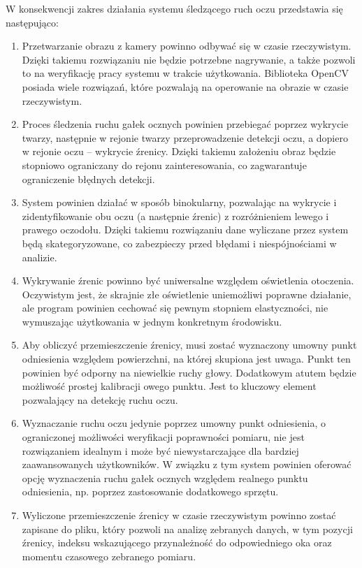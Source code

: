 \documentclass[a4paper,twoside,12pt]{book}
\begin{document}
W konsekwencji zakres działania systemu śledzącego ruch oczu przedstawia się następująco:

\begin{enumerate}
	\item Przetwarzanie obrazu z kamery powinno odbywać się w czasie rzeczywistym. Dzięki takiemu rozwiązaniu nie będzie potrzebne nagrywanie, a także pozwoli to na weryfikację pracy systemu w trakcie użytkowania. Biblioteka OpenCV posiada wiele rozwiązań, które pozwalają na operowanie na obrazie w czasie rzeczywistym.
	\item Proces śledzenia ruchu gałek ocznych powinien przebiegać poprzez wykrycie twarzy, następnie w rejonie twarzy przeprowadzenie detekcji oczu, a dopiero w rejonie oczu -- wykrycie źrenicy. Dzięki takiemu założeniu obraz będzie stopniowo ograniczany do rejonu zainteresowania, co zagwarantuje ograniczenie błędnych detekcji.
	\item System powinien działać w sposób binokularny, pozwalając na wykrycie i zidentyfikowanie obu oczu (a następnie źrenic) z rozróżnieniem lewego i prawego oczodołu. Dzięki takiemu rozwiązaniu dane wyliczane przez system będą skategoryzowane, co zabezpieczy przed błędami i niespójnościami w analizie.
	\item Wykrywanie źrenic powinno być uniwersalne względem oświetlenia otoczenia. Oczywistym jest, że skrajnie złe oświetlenie uniemożliwi poprawne działanie, ale program powinien cechować się pewnym stopniem elastyczności, nie wymuszając użytkowania w jednym konkretnym środowisku.
	\item Aby obliczyć przemieszczenie źrenicy, musi zostać wyznaczony umowny punkt odniesienia względem powierzchni, na której skupiona jest uwaga. Punkt ten powinien być odporny na niewielkie ruchy głowy. Dodatkowym atutem będzie możliwość prostej kalibracji owego punktu. Jest to kluczowy element pozwalający na detekcję ruchu oczu.
	\item Wyznaczanie ruchu oczu jedynie poprzez umowny punkt odniesienia, o ograniczonej możliwości weryfikacji poprawności pomiaru, nie jest rozwiązaniem idealnym i może być niewystarczające dla bardziej zaawansowanych użytkowników. W związku z tym system powinien oferować opcję wyznaczenia ruchu gałek ocznych względem realnego punktu odniesienia, np. poprzez zastosowanie dodatkowego sprzętu.
	\item Wyliczone przemieszczenie źrenicy w czasie rzeczywistym powinno zostać zapisane do pliku, który pozwoli na analizę zebranych danych, w tym pozycji źrenicy, indeksu wskazującego przynależność do odpowiedniego oka oraz momentu czasowego zebranego pomiaru.
\end{enumerate}
\end{document}
